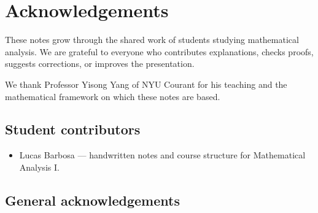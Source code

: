 \chapter*{Acknowledgements}

These notes grow through the shared work of students studying mathematical
analysis. We are grateful to everyone who contributes explanations,
checks proofs, suggests corrections, or improves the presentation.

We thank Professor Yisong Yang of NYU Courant for his teaching and the
mathematical framework on which these notes are based.

\section*{Student contributors}

\begin{itemize}
  \item Lucas Barbosa --- handwritten notes and course structure
    for Mathematical Analysis I.
\end{itemize}

\section*{General acknowledgements}

